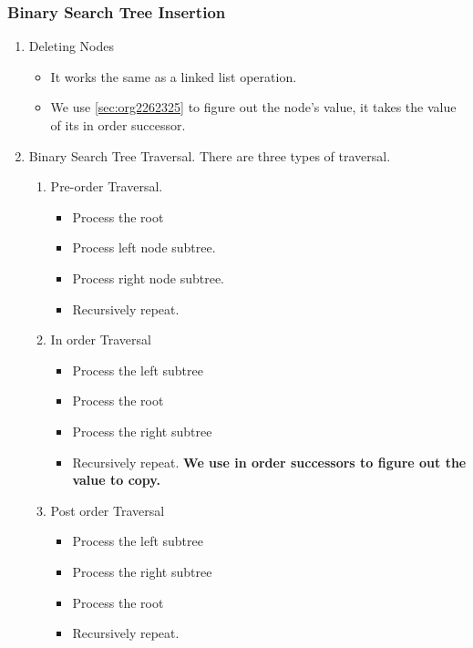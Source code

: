 \documentclass[11pt]{article}
\begin{document}
\subsubsection{Binary Search Tree Insertion}
\label{sec:org3e41c48}
\begin{enumerate}
\item Deleting Nodes
\label{sec:orgd3e98f8}
\begin{itemize}
\item It works the same as a linked list operation.
\item We use \ref{sec:org2262325} to figure out the node's value, it takes the value of its in order successor.
\end{itemize}
\item Binary Search Tree Traversal.
\label{sec:orgb7505d3}
There are three types of traversal.
\begin{enumerate}
\item Pre-order Traversal.
\label{sec:org8cfcea2}
\begin{itemize}
\item Process the root
\item Process left node subtree.
\item Process right node subtree.
\item Recursively repeat.
\end{itemize}
\item In order Traversal
\label{sec:org2262325}
\begin{itemize}
\item Process the left subtree
\item Process the root
\item Process the right subtree
\item Recursively repeat.
\textbf{\textbf{We use in order successors to figure out the value to copy.}}
\end{itemize}
\item Post order Traversal
\label{sec:org8ea064c}
\begin{itemize}
\item Process the left subtree
\item Process the right subtree
\item Process the root
\item Recursively repeat.
\end{itemize}
\end{enumerate}
\end{enumerate}
\end{document}
